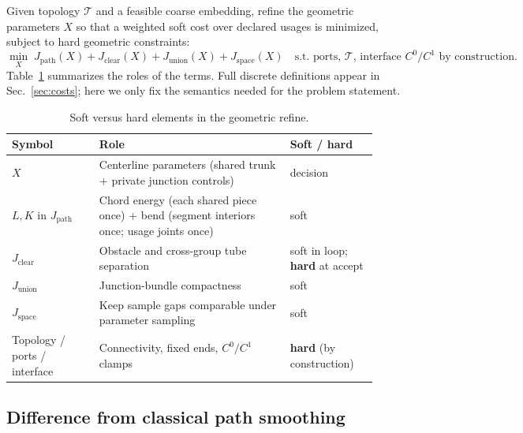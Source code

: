 Given topology $\mathcal{T}$ and a feasible coarse embedding, refine the
geometric parameters $X$ so that a weighted soft cost over declared usages is
minimized, subject to hard geometric constraints:
\begin{equation}
\label{eq:stage1}
\min_{X}
\;
J_{\mathrm{path}}(X)
+
J_{\mathrm{clear}}(X)
+
J_{\mathrm{union}}(X)
+
J_{\mathrm{space}}(X)
\quad
\text{s.t.\ ports, }\mathcal{T}\text{, interface }C^{0}/C^{1}
\text{ by construction.}
\end{equation}
Table~\ref{tab:soft-hard} summarizes the roles of the terms.
Full discrete definitions appear in Sec.~\ref{sec:costs}; here we only fix the
semantics needed for the problem statement.

\begin{table}[H]
  \centering
  \caption{Soft versus hard elements in the geometric refine.}
  \label{tab:soft-hard}
  \begin{tabular}{@{}p{0.22\linewidth}p{0.48\linewidth}p{0.22\linewidth}@{}}
    \toprule
    Symbol & Role & Soft / hard \\
    \midrule
    $X$
      & Centerline parameters (shared trunk + private junction controls)
      & decision \\
    $L,K$ in $J_{\mathrm{path}}$
      & Chord energy (each shared piece once) + bend (segment interiors once;
        usage joints once)
      & soft \\
    $J_{\mathrm{clear}}$
      & Obstacle and cross-group tube separation
      & soft in loop; \textbf{hard} at accept \\
    $J_{\mathrm{union}}$
      & Junction-bundle compactness
      & soft \\
    $J_{\mathrm{space}}$
      & Keep sample gaps comparable under parameter sampling
      & soft \\
    Topology / ports / interface
      & Connectivity, fixed ends, $C^{0}/C^{1}$ clamps
      & \textbf{hard} (by construction) \\
    \bottomrule
  \end{tabular}
\end{table}

\subsection{Difference from classical path smoothing}
\label{sec:problem:diff}

